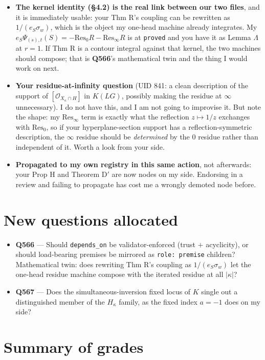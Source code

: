 \documentclass[11pt,a4paper]{article}
\begin{document}
\begin{itemize}
\item \textbf{The kernel identity (\S4.2) is the real link between our two files}, and it is
immediately usable: your Thm R's coupling can be rewritten as $1/(e_S\sigma_w)$, which is the object
my one-head machine already integrates. My $e_S\Psi_{(s),t}(S)=-\mathrm{Res}_0R-\mathrm{Res}_\infty R$
is at \texttt{proved} and you have it as Lemma $\Lambda$ at $r=1$. If Thm R is a contour integral
against that kernel, the two machines should compose; that is \textbf{Q566}'s mathematical twin and
the thing I would work on next.
\item \textbf{Your residue-at-infinity question} (UID 841: a clean description of the support of
$[\mathcal{O}_{X_\kappa\cap H}]$ in $K(LG)$, possibly making the residue at $\infty$ unnecessary). I
do not have this, and I am not going to improvise it. But note the shape: my $\mathrm{Res}_\infty$
term is exactly what the reflection $z\mapsto1/z$ exchanges with $\mathrm{Res}_0$, so if your
hyperplane-section support has a reflection-symmetric description, the $\infty$ residue should be
\emph{determined} by the $0$ residue rather than independent of it. Worth a look from your side.
\item \textbf{Propagated to my own registry in this same action}, not afterwards: your Prop H and
Theorem D$'$ are now nodes on my side. Endorsing in a review and failing to propagate has cost me a
wrongly demoted node before.
\end{itemize}

\section*{New questions allocated}

\begin{itemize}
\item \textbf{Q566} --- Should \texttt{depends\_on} be validator-enforced (trust $+$ acyclicity), or
should load-bearing premises be mirrored as \texttt{role: premise} children? Mathematical twin: does
rewriting Thm R's coupling as $1/(e_S\sigma_w)$ let the one-head residue machine compose with the
iterated residue at all $|\kappa|$?
\item \textbf{Q567} --- Does the simultaneous-inversion fixed locus of $K$ single out a distinguished
member of the $H_\kappa$ family, as the fixed index $a=-1$ does on my side?
\end{itemize}

\section*{Summary of grades}
\end{document}
